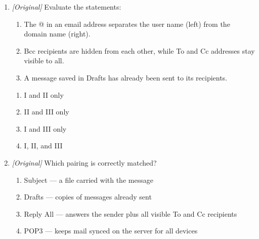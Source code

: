 \begin{enumerate}[label=\textbf{Q\arabic*.}, leftmargin=*]
\begin{enumerate}[label=\Alph*.]
    \item Internal Mail Attachment Program
    \item Internet Media Archive Process
    \item Integrated Message Alert Protocol
  \end{enumerate}
\item \textit{[Original]} Evaluate the statements:
  \begin{enumerate}[label=\Roman*.]
    \item The @ in an email address separates the user name (left) from the domain name (right).
    \item Bcc recipients are hidden from each other, while To and Cc addresses stay visible to all.
    \item A message saved in Drafts has already been sent to its recipients.
  \end{enumerate}
  \begin{enumerate}[label=\Alph*.]
    \item I and II only
    \item II and III only
    \item I and III only
    \item I, II, and III
  \end{enumerate}
\item \textit{[Original]} Which pairing is correctly matched?
  \begin{enumerate}[label=\Alph*.]
    \item Subject --- a file carried with the message
    \item Drafts --- copies of messages already sent
    \item Reply All --- answers the sender plus all visible To and Cc recipients
    \item POP3 --- keeps mail synced on the server for all devices
  \end{enumerate}


\end{enumerate}

